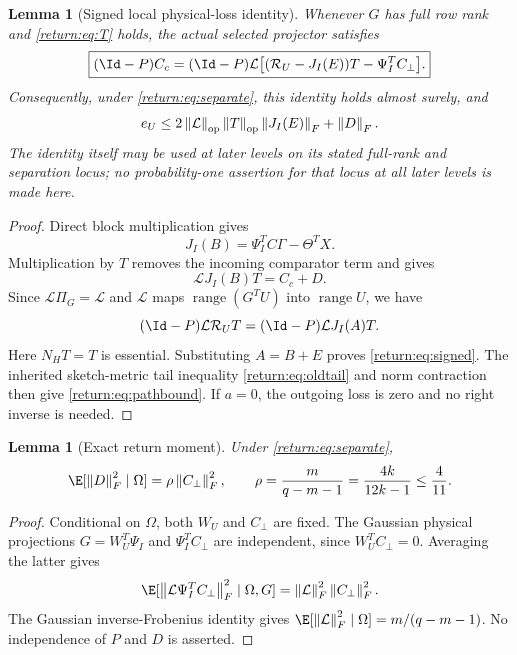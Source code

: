 \documentclass[11pt,oneside,openany,a4paper]{book}
\numberwithin{equation}{chapter}
\newtheorem{lemma}[theorem]{Lemma}
\theoremstyle{definition}
\theoremstyle{remark}
\newcommand{\F}[1]{\left\lVert#1\right\rVert_F}
\newcommand{\op}[1]{\left\lVert#1\right\rVert_{\rm op}}
\DeclareMathOperator{\ran}{range}\DeclareMathOperator{\OPT}{OPT}
\begin{document}
\begin{lemma}[Signed local physical-loss identity]\label{return:lem:signed}
Whenever $G$ has full row rank and \eqref{return:eq:T} holds, the actual selected projector satisfies
\begin{equation}\label{return:eq:signed}
 \boxed{(\Id-P)C_c=(\Id-P)\mathcal L
 \big[(\mathcal R_U-J_I(E))T-\Psi_I^TC_\perp\big].}
\end{equation}
Consequently, under \eqref{return:eq:separate}, this identity holds almost surely, and
\begin{equation}\label{return:eq:pathbound}
 e_U\le2\op{\mathcal L}\op T\F{J_I(E)}+\F D.
\end{equation}
The identity itself may be used at later levels on its stated full-rank and separation locus; no probability-one assertion for that locus at all later levels is made here.
\end{lemma}
\begin{proof}
Direct block multiplication gives
\[
 J_I(B)=\Psi_I^TC\Gamma-\Theta^TX.
\]
Multiplication by $T$ removes the incoming comparator term and gives
\[
 \mathcal L J_I(B)T=C_c+D.
\]
Since $\mathcal L\Pi_G=\mathcal L$ and $\mathcal L$ maps $\ran(G^TU)$ into $\ran U$, we have
\[
 (\Id-P)\mathcal L\mathcal R_UT
  =(\Id-P)\mathcal LJ_I(A)T.
\]
Here $N_HT=T$ is essential. Substituting $A=B+E$ proves \eqref{return:eq:signed}. The inherited sketch-metric tail inequality \eqref{return:eq:oldtail} and norm contraction then give \eqref{return:eq:pathbound}. If $a=0$, the outgoing loss is zero and no right inverse is needed.
\end{proof}

\begin{lemma}[Exact return moment]\label{return:lem:D}
Under \eqref{return:eq:separate},
\begin{equation}\label{return:eq:Dmoment}
 \E[\F D^2\mid\Omega]=\rho\F{C_\perp}^2,
 \qquad \rho=\frac{m}{q-m-1}=\frac{4k}{12k-1}\le\frac4{11}.
\end{equation}
\end{lemma}
\begin{proof}
Conditional on $\Omega$, both $W_U$ and $C_\perp$ are fixed. The Gaussian physical projections $G=W_U^T\Psi_I$ and $\Psi_I^TC_\perp$ are independent, since $W_U^TC_\perp=0$. Averaging the latter gives
\[
 \E[\F{\mathcal L\Psi_I^TC_\perp}^2\mid\Omega,G]
     =\F{\mathcal L}^2\F{C_\perp}^2.
\]
The Gaussian inverse-Frobenius identity \cite{HMT} gives
$\E[\F{\mathcal L}^2\mid\Omega]=m/(q-m-1)$. No independence of $P$ and $D$ is asserted.
\end{proof}
\end{document}
